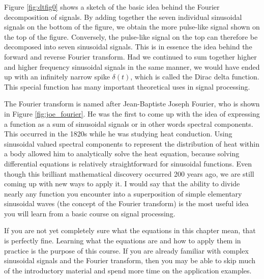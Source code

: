 Figure \ref{fig:dtfig0} shows a sketch of the basic idea behind the
Fourier decomposition of signals. By adding together the seven
individual sinusoidal signals on the bottom of the figure, we obtain
the more pulse-like signal shown on the top of the figure. Conversely,
the pulse-like signal on the top can therefore be decomposed into
seven sinusoidal signals. This is in essence the idea behind the
forward and reverse Fourier transform. Had we continued to sum
together higher and higher frequency sinusoidal signals in the same
manner, we would have ended up with an infinitely narrow spike
$\delta(t)$, which is called the Dirac delta function. This special
function has many important theoretical uses in signal
processing.

The Fourier transform is named after Jean-Baptiste Joseph Fourier, who
is shown in Figure \ref{fig:joe_fourier}. He was the first to come up
with the idea of expressing a function as a sum of sinusoidal signals
or in other words spectral components. This occurred in the 1820s
while he was studying heat conduction. Using sinusoidal valued
spectral components to represent the distribution of heat within a
body allowed him to analytically solve the heat equation, because
solving differential equations is relatively straightforward for
sinusoidal functions. Even though this brilliant mathematical
discovery occurred 200 years ago, we are still coming up with new ways
to apply it. I would say that the ability to divide nearly any function you
encounter into a superposition of simple elementary sinusoidal waves
(the concept of the Fourier transform) is the most useful idea you
will learn from a basic course on signal processing.

If you are not yet completely sure what the equations in this chapter
mean, that is perfectly fine. Learning what the equations are and how
to apply them in practice is the purpose of this course. If you are
already familiar with complex sinusoidal signals and the Fourier
transform, then you may be able to skip much of the introductory
material and spend more time on the application examples.


